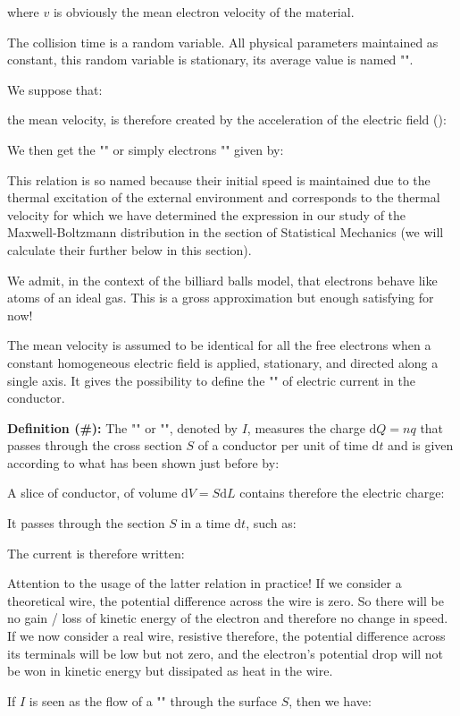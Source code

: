 	where $v$ is obviously the mean electron velocity of the material.
	
	The collision time is a random variable. All physical parameters maintained as constant, this random variable is stationary, its average value is named "".
	
	We suppose that:
	
	the mean velocity, is therefore created by the acceleration of the electric field ():
	
	We then get the "" or simply electrons "" given by:
	
	This relation is so named because their initial speed is maintained due to the thermal excitation of the external environment and corresponds to the thermal velocity for which we have determined the expression in our study of the Maxwell-Boltzmann distribution in the section of Statistical Mechanics (we will calculate their further below in this section).
	
	We admit, in the context of the billiard balls model, that electrons behave like atoms of an ideal gas. This is a gross approximation but enough satisfying for now!
	
	The mean velocity is assumed to be identical for all the free electrons when a constant homogeneous electric field is applied, stationary, and directed along a single axis. It gives the possibility to define the "" of electric current in the conductor.
	
	\textbf{Definition (\#\mydef):} The "" or "", denoted by $I$,  measures the charge $\mathrm{d}Q=nq$ that passes through the cross section $S$ of a conductor per unit of time $\mathrm{d}t$ and is given according to what has been shown just before by:
	
	A slice of conductor, of volume $\mathrm{d}V=S\mathrm{d}L$ contains therefore the electric charge:
	
	It passes through the section $S$ in a time $\mathrm{d}t$, such as:
	
	The current is therefore written:
	
	\begin{tcolorbox}[title=Remark,colframe=black,arc=10pt]
	Attention to the usage of the latter relation in practice! If we consider a theoretical wire, the potential difference across the wire is zero. So there will be no gain / loss of kinetic energy of the electron and therefore no change in speed. If we now consider a real wire, resistive therefore, the potential difference across its terminals will be low but not zero, and the electron's potential drop will not be won in kinetic energy but dissipated as heat in the wire.
	\end{tcolorbox}
	If $I$ is seen as the flow of a "\label{current density}" through the surface $S$, then we have:
	
